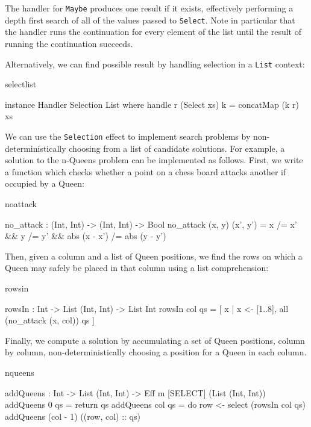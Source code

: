 \noindent
The handler for \texttt{Maybe} produces one result if it exists, effectively
performing a depth first search of all of the values passed to \texttt{Select}.
Note in particular that the handler runs the continuation for every element
of the list until the result of running the continuation succeeds.

Alternatively, we can find  possible result by handling selection
in a \texttt{List} context:

\begin{SaveVerbatim}{selectlist}

instance Handler Selection List where
     handle r (Select xs) k = concatMap (k r) xs

\end{SaveVerbatim}

\noindent
We can use the \texttt{Selection} effect to implement search problems by
non-deterministically choosing from a list of candidate solutions. For example,
a solution to the n-Queens problem can be implemented as follows.
First, we write a function which checks whether a point on a chess board
attacks another if occupied by a Queen:

\begin{SaveVerbatim}{noattack}

no_attack : (Int, Int) -> (Int, Int) -> Bool
no_attack (x, y) (x', y')
  = x /= x' && y /= y' && abs (x - x') /= abs (y - y')

\end{SaveVerbatim}

\noindent
Then, given a column and a list of Queen positions, we find the rows on which
a Queen may safely be placed in that column using a list comprehension:

\begin{SaveVerbatim}{rowsin}

rowsIn : Int -> List (Int, Int) -> List Int
rowsIn col qs 
   = [ x | x <- [1..8], all (no_attack (x, col)) qs ]

\end{SaveVerbatim}

\noindent
Finally, we compute a solution by accumulating a set of Queen positions,
column by column, non-deterministically choosing a position for a Queen in
each column.

\begin{SaveVerbatim}{nqueens}

addQueens : Int -> List (Int, Int) -> 
            Eff m [SELECT] (List (Int, Int))
addQueens 0   qs = return qs
addQueens col qs 
   = do row <- select (rowsIn col qs)
        addQueens (col - 1) ((row, col) :: qs)

\end{SaveVerbatim}

